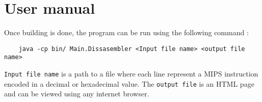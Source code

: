 \section{User manual}

Once building is done, the program can be run using the following command :
\begin{verbatim}
	java -cp bin/ Main.Dissasembler <Input file name> <output file name>
\end{verbatim} 
\verb?Input file name? is a path to a file where each line represent a MIPS instruction encoded in a decimal or hexadecimal value. The \verb?output file? is an HTML page and can be viewed using any internet browser. 

